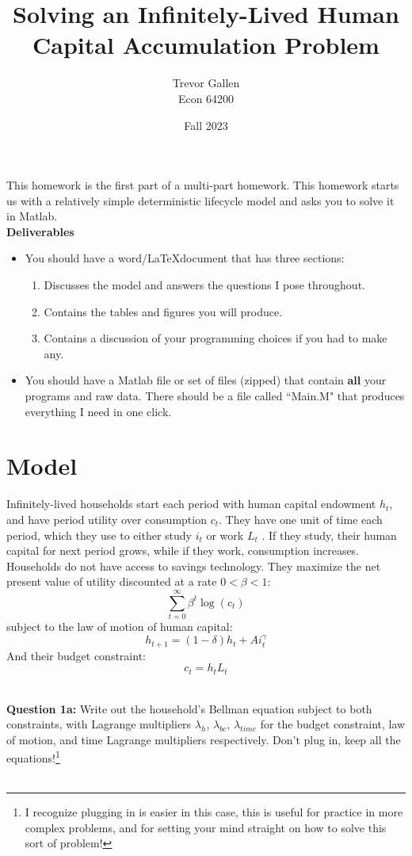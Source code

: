 \documentclass[11pt]{article}
\title{Solving an Infinitely-Lived Human Capital Accumulation Problem}
\author{ Trevor Gallen \\ Econ 64200 }
\date{Fall 2023}
\begin{document}


\maketitle

This homework is the first part of a multi-part homework.  This homework starts us with a relatively simple deterministic lifecycle model and asks you to solve it in Matlab.\\

\textbf{Deliverables}
\begin{itemize}
\item You should have a word/\LaTeX document that has three sections: 
\begin{enumerate}
\item Discusses the model and answers the questions I pose throughout.
\item Contains the tables and figures you will produce.
\item Contains a discussion of your programming choices if you had to make any.
\end{enumerate}
\item You should have a Matlab file or set of files (zipped) that contain \textbf{all} your programs and raw data.  There should be a file called ``Main.M" that produces everything I need in one click.
\end{itemize}


\section{Model}
Infinitely-lived households start each period with human capital endowment $h_t$, and have period utility over consumption $c_t$.  They have one unit of time each period, which they use to either study $i_t$ or work $L_t$ . If they study, their human capital for next period grows, while if they work, consumption increases.  Households do not have access to savings technology.  They maximize the net present value of utility discounted at a rate $0<\beta<1$:
$$\sum_{t=0}^\infty \beta^t\log(c_t)$$
subject to the law of motion of human capital:
$$h_{t+1}=(1-\delta)h_t+Ai_t^\gamma$$
And their budget constraint:
$$c_t=h_tL_t$$

\ \\
\textbf{Question 1a:} Write out the household's Bellman equation subject to both constraints, with Lagrange multipliers $\lambda_{h}$,  $\lambda_{bc}$, $\lambda_{time}$ for the budget constraint, law of motion, and time Lagrange multipliers respectively. Don't plug in, keep all the equations!\footnote{I recognize plugging in is easier in this case, this is useful for practice in more complex problems, and for setting your mind straight on how to solve this sort of problem!}\\
\ \\
\end{document}
